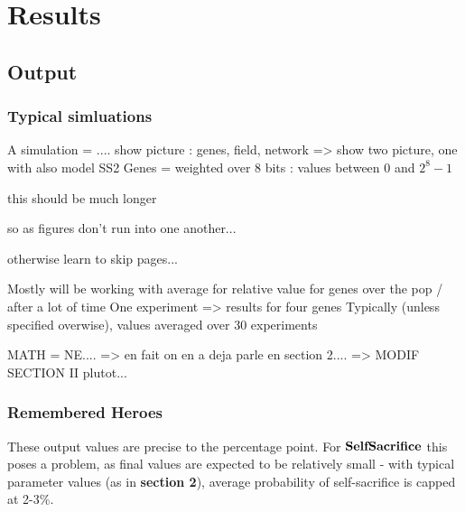 \documentclass[a4paper,12pt]{report}
\begin{document}
\setlength{\parindent}{0pt}
\setlength{\parskip}{6pt}















\chapter{Results}
\section{Output}
\subsection{Typical simluations}


A simulation = .... show picture : genes, field, network
=> show two picture, one with also model SS2
Genes = weighted over 8 bits : values between $0$ and $2^8 - 1$

this should be much longer


so as figures don't run into one another... 

otherwise learn to skip pages...

Mostly will be working with average for relative value for genes over the pop / after a lot of time
One experiment => results for four genes
Typically (unless specified overwise), values averaged over 30 experiments


MATH = NE.... => en fait on en a deja parle en section 2.... 
    => MODIF SECTION II plutot...

\subsection{Remembered Heroes}
\label{ss:RH}
These output values are precise to the percentage point. 
For $\bf{SelfSacrifice}$ this poses a problem, as final values are expected to be relatively
small - with typical parameter values (as in \textbf{section 2}), average probability of self-sacrifice
 is capped at 2-3\%.
\end{document}
